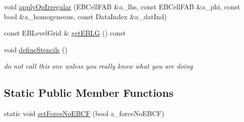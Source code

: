 \begin{DoxyCompactItemize}
\item 
void \hyperlink{classebconductivityop_a136fec968d2edc0be5ead837c420c9ae}{apply\+Op\+Irregular} (E\+B\+Cell\+F\+AB \&a\+\_\+lhs, const E\+B\+Cell\+F\+AB \&a\+\_\+phi, const bool \&a\+\_\+homogeneous, const Data\+Index \&a\+\_\+dat\+Ind)
\item 
const E\+B\+Level\+Grid \& \hyperlink{classebconductivityop_abe5e08fd0aa7471e596fcd9c7292d440}{get\+E\+B\+LG} () const 
\item 
void \hyperlink{classebconductivityop_a1b52dacdd94eebdafcd3acd7b35e9f33}{define\+Stencils} ()
\begin{DoxyCompactList}\small\item\em do not call this one unless you really know what you are doing \end{DoxyCompactList}\end{DoxyCompactItemize}
\subsection*{Static Public Member Functions}
\begin{DoxyCompactItemize}
\item 
static void \hyperlink{classebconductivityop_abe4fbfab98ca4e40405b98e0e037946e}{set\+Force\+No\+E\+B\+CF} (bool a\+\_\+force\+No\+E\+B\+CF)
\end{DoxyCompactItemize}
